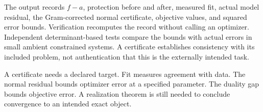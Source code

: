 The output records $f-a$, protection before and after, measured fit, actual model residual, the Gram-corrected normal certificate, objective values, and squared error bounds. Verification recomputes the record without calling an optimizer. Independent determinant-based tests compare the bounds with actual errors in small ambient constrained systems. A certificate establishes consistency with its included problem, not authentication that this is the externally intended task.

\begin{insight}
A certificate needs a declared target. Fit measures agreement with data. The normal residual bounds optimizer error at a specified parameter. The duality gap bounds objective error. A realization theorem is still needed to conclude convergence to an intended exact object.
\end{insight}

